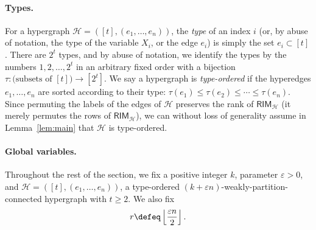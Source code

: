 \documentclass{article}[11pt]
\begin{document}
\paragraph{Types.}
For a hypergraph $\mathcal{H}=([t],(e_1,\dots,e_n))$, the \emph{type} of an index $i$ (or, by abuse of notation, the type of the variable $X_i$, or the edge $e_i$) is simply the set $e_i\subset[t]$.
There are $2^t$ types, and by abuse of notation, we identify the types by the numbers $1,2,\dots,2^t$ in an arbitrary fixed order with a bijection $\tau:\text{(subsets of $[t]$)}\to [2^t]$.
We say a hypergraph is \emph{type-ordered} if the hyperedges $e_1,\dots,e_n$ are sorted according to their type: $\tau(e_1) \le \tau(e_2)\le\cdots\le \tau(e_n)$.
Since permuting the labels of the edges of $\mathcal{H}$ preserves the rank of $\mathsf{RIM}_{\mathcal{H}}$ (it merely permutes the rows of $\mathsf{RIM}_\mathcal{H}$), we can without loss of generality assume in Lemma~\ref{lem:main} that $\mathcal{H}$ is type-ordered. 

\paragraph{Global variables.}
Throughout the rest of the section, we fix a positive integer $k$, parameter $\varepsilon>0$, and  $\mathcal{H}=([t],(e_1,\dots,e_n))$, a type-ordered $(k+\varepsilon n)$-weakly-partition-connected hypergraph with $t \ge 2$. We also fix
\begin{align}
  r\defeq \left\lfloor \frac{\varepsilon n}{2} \right\rfloor.
  \label{}
\end{align}
\end{document}
